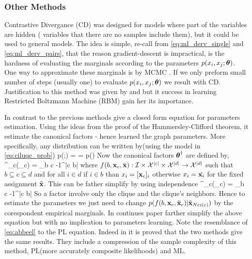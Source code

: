 \subsubsection{Other Methods}
Contrastive Divergance (CD) \cite{hinton2002training}  was designed for models where part of the variables are hidden ( variables that there are no samples include them), but it could be used to general models.
The idea is simple, re-call from \eqref{eq:ml_derv_single} and \eqref{eq:ml_derv_pairs}, that the reason gradient-descent is impractical,  is  the hardness of evaluating the marginals according to the parameters $p(x_i,x_j;\boldsymbol{\theta})$. 
One way to approximate these marginals  is by MCMC .
If we only preform small number of steps (usually one) to evaluate $p(x_i,x_j;\boldsymbol{\theta})$ we result with CD.
Justification to this method was given by \cite{bengio2009justifying} and \cite{carreira2005contrastive} but it success in learning Restricted Boltzmann Machine (RBM) gain her its importance.

In contrast to the previous methods   \cite{abbeel2006learning} give a closed form equation for parameters estimation.
Using the ideas from the proof of the Hammersley-Clifford theorem,  it estimate the canonical factors  - hence learned the graph parameters.
More specifically, any distribution can be written by(using the model in \eqref{eq:ciluqe_prob}) 
\be
p(\xx;\exact{\thetav}) =   = p(\tilde{\xx})
\ee
Now the canonical factors $\boldsymbol{\theta}^{\dagger}$ are defined by,
\be
\thetav^{\dagger}_{c}(\xx_c) = \sum_{b \subseteq c} -1^{|c \setminus b|} 
\ee
where  $f(b,{\bf x}_c,\tilde{{\bf x}}) : {\cal I} \times {\cal X}^{|c|} \times {\cal X}^{|d|}\to {\cal X}^{|d|}$  such that $b \subseteq c\subseteq d$ and for all $i \in d$ if $i \in b$ than $x_i = [{\bf x}_c]_i$ otherwise $x_i = \tilde{{\bf x}_i}$ for the fixed assignment $\tilde{{\bf x}}$.
This can be father simplify by using independence 
\be
\label{eq:abbeel}
\thetav^{\dagger}_{c}(\xx_c) = \sum_{b \subseteq c} -1^{|c \setminus b|} 
\ee
So a factor involve only the clique and the clique's neighbors.
Hence to estimate the parameters we just need to change $p(f(b,{\bf x}_c,\tilde{{\bf x}}_c) |\tilde{{\bf x}}_{Nei(c)})$ by the corespondent empirical marginals.
In continues  paper \cite{roy2009learning} farther simplify the above equation but with no  implication to parameters learning.
Note the resemblance of  \eqref{eq:abbeel} to the PL equation.
Indeed in \cite{bradley2012sample} it is proved that the two methods give the same results.
They include a compression of the sample complexity of this method, PL(more accurately composite likelihoods)  and ML.

